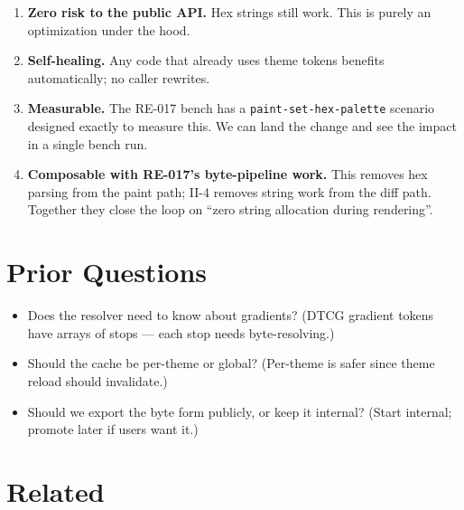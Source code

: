 \begin{enumerate}
\def\labelenumi{\arabic{enumi}.}
\tightlist
\item
  \textbf{Zero risk to the public API.} Hex strings still work. This is purely an optimization under the hood.
\item
  \textbf{Self-healing.} Any code that already uses theme tokens benefits automatically; no caller rewrites.
\item
  \textbf{Measurable.} The RE-017 bench has a \texttt{p\allowbreak{}a\allowbreak{}i\allowbreak{}n\allowbreak{}t\allowbreak{}-\allowbreak{}s\allowbreak{}e\allowbreak{}t\allowbreak{}-\allowbreak{}h\allowbreak{}e\allowbreak{}x\allowbreak{}-\allowbreak{}p\allowbreak{}a\allowbreak{}l\allowbreak{}e\allowbreak{}t\allowbreak{}t\allowbreak{}e} scenario designed exactly to measure this. We can land the change and see the impact in a single bench run.
\item
  \textbf{Composable with RE-017's byte-pipeline work.} This removes hex parsing from the paint path; II-4 removes string work from the diff path. Together they close the loop on ``zero string allocation during rendering''.
\end{enumerate}

\section{Prior Questions}\label{record-369-prior-questions}

\begin{itemize}
\tightlist
\item
  Does the resolver need to know about gradients? (DTCG gradient tokens have arrays of stops --- each stop needs byte-resolving.)
\item
  Should the cache be per-theme or global? (Per-theme is safer since theme reload should invalidate.)
\item
  Should we export the byte form publicly, or keep it internal? (Start internal; promote later if users want it.)
\end{itemize}

\section{Related}\label{record-369-related}

